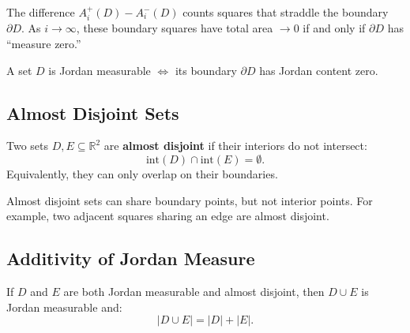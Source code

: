 \documentclass[11pt]{report}
\newcommand{\R}{\mathbb{R}}
\begin{document}
\begin{remark}
The difference $A_i^+(D) - A_i^-(D)$ counts squares that straddle the boundary $\partial D$. As $i \to \infty$, these boundary squares have total area $\to 0$ if and only if $\partial D$ has ``measure zero.''

A set $D$ is Jordan measurable $\iff$ its boundary $\partial D$ has Jordan content zero.
\end{remark}

\subsection*{Almost Disjoint Sets}

\begin{definition}
Two sets $D, E \subseteq \R^2$ are \textbf{almost disjoint} if their interiors do not intersect:
\[
\text{int}(D) \cap \text{int}(E) = \emptyset.
\]
Equivalently, they can only overlap on their boundaries.
\end{definition}

\begin{remark}
Almost disjoint sets can share boundary points, but not interior points. For example, two adjacent squares sharing an edge are almost disjoint.
\end{remark}

\subsection*{Additivity of Jordan Measure}

\begin{theorem}[Additivity]
If $D$ and $E$ are both Jordan measurable and almost disjoint, then $D \cup E$ is Jordan measurable and:
\[
|D \cup E| = |D| + |E|.
\]
\end{theorem}
\end{document}

